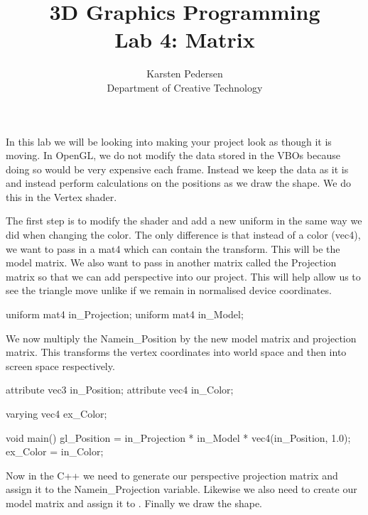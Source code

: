 \documentclass[10pt]{article}
\begin{document}
\title{3D Graphics Programming \\
  \large Lab 4: Matrix}

\author{Karsten Pedersen\\ Department of Creative Technology}
\maketitle

In this lab we will be looking into making your project look as though
it is moving.  In OpenGL, we do not modify the data stored in the VBOs
because doing so would be very expensive each frame. Instead we keep
the data as it is and instead perform calculations on the positions as
we draw the shape.  We do this in the Vertex shader.

The first step is to modify the shader and add a new uniform in the
same way we did when changing the color. The only difference is that
instead of a color (vec4), we want to pass in a mat4 which can contain
the transform.  This will be the model matrix. We also want to pass in
another matrix called the Projection matrix so that we can add perspective
into our project. This will help allow us to see the triangle move unlike
if we remain in normalised device coordinates.

\begin{Code}

uniform mat4 in_Projection;
uniform mat4 in_Model;

\end{Code}

We now multiply the Name{in\_Position} by the new model matrix and projection
matrix.  This transforms the vertex coordinates into world space and
then into screen space respectively.

\begin{Code}

attribute vec3 in_Position;
attribute vec4 in_Color;

varying vec4 ex_Color;

void main()
{
  gl_Position = in_Projection * in_Model * vec4(in_Position, 1.0);
  ex_Color = in_Color;
}

\end{Code}

Now in the C++ we need to generate our perspective projection matrix
and assign it to the Name{in\_Projection} variable.  Likewise we also need to
create our model matrix and assign it to . Finally we draw the shape.
\end{document}
